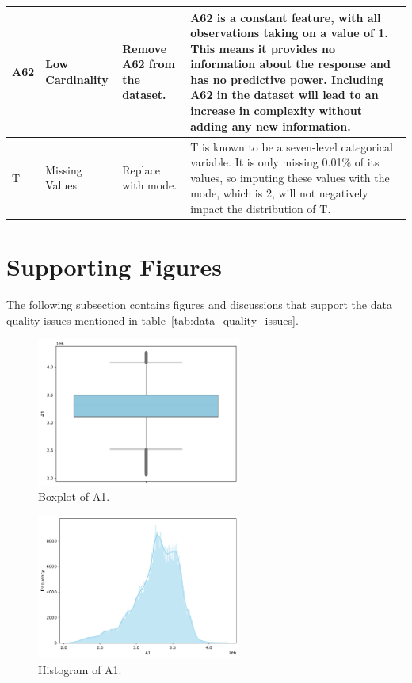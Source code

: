 \documentclass[11pt]{report}
\begin{document}
\begin{longtable}{p{2cm}p{3cm}p{4cm}p{6cm}}
\midrule
A62 & Low Cardinality & Remove A62 from the dataset. & A62 is a constant feature, with all observations taking on a value of 1. This means it provides no information about the response and has no predictive power. Including A62 in the dataset will lead to an increase in complexity without adding any new information. \\
\midrule
T & Missing Values & Replace with mode. & T is known to be a seven-level categorical variable. It is only missing 0.01\% of its values, so imputing these values with the mode, which is 2, will not negatively impact the distribution of T. \\
\end{longtable}


\section*{Supporting Figures}

The following subsection contains figures and discussions that support the data quality issues mentioned in table~\ref{tab:data_quality_issues}.

\begin{figure}[H]
    \centering
    \includegraphics[width=0.6\textwidth]{images/A1_boxplot.pdf}
    \caption{Boxplot of A1.}
    \label{fig:a1_boxplot}
\end{figure}

\begin{figure}[H]
    \centering
    \includegraphics[width=0.6\textwidth]{images/A1_histplot.pdf}
    \caption{Histogram of A1.}
    \label{fig:a1_histplot}
\end{figure}
\end{document}
